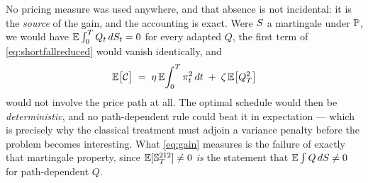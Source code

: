 \medskip





No pricing measure was used anywhere, and that absence is not incidental: it is the \emph{source}
of the gain, and the accounting is exact. Were $S$ a martingale under $\mathbb{P}$, we would have
$\mathbb{E}\int_0^{T}Q_t\,dS_t=0$ for every adapted $Q$, the first term of
\eqref{eq:shortfallreduced} would vanish identically, and
\[
  \mathbb{E}\bigl[\mathcal{C}\bigr]\;=\;\eta\,\mathbb{E}\!\int_0^{T}\pi_t^{2}\,d t\;+\;\zeta\,\mathbb{E}\bigl[Q_T^{2}\bigr]
\]
would not involve the price path at all. The optimal schedule would then be \emph{deterministic},
and no path-dependent rule could beat it in expectation --- which is precisely why the classical
treatment \cite{almgrenchriss2001} must adjoin a variance penalty before the problem becomes
interesting. What \eqref{eq:gain} measures is the failure of exactly that martingale property, since
$\mathbb{E}[\mathbb{S}^{212}_T]\neq0$ \emph{is} the statement that $\mathbb{E}\int Q\,dS\neq0$ for
path-dependent $Q$.

